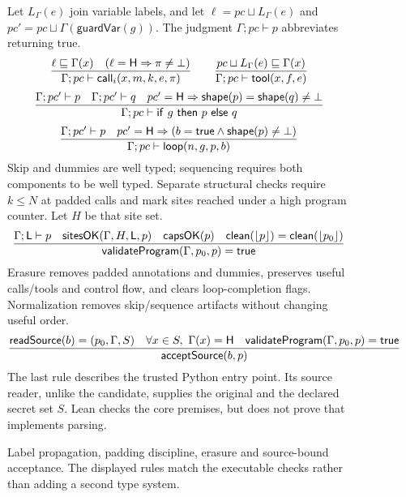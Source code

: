 \begin{figure}[p]
\small
Let $L_\Gamma(e)$ join variable labels, and let
$\ell=pc\sqcup L_\Gamma(e)$ and $pc'=pc\sqcup\Gamma(\mathsf{guardVar}(g))$.
The judgment $\Gamma;pc\vdash p$ abbreviates  returning true.
\[
\frac{\ell\sqsubseteq\Gamma(x)\quad(\ell=\mathsf{H}\Rightarrow\pi\ne\bot)}
 {\Gamma;pc\vdash\mathsf{call}_i(x,m,k,e,\pi)}
\qquad
\frac{pc\sqcup L_\Gamma(e)\sqsubseteq\Gamma(x)}
 {\Gamma;pc\vdash\mathsf{tool}(x,f,e)}
\]
\[
\frac{\Gamma;pc'\vdash p\quad\Gamma;pc'\vdash q\quad
 pc'=\hi\Rightarrow\mathsf{shape}(p)=\mathsf{shape}(q)\ne\bot}
 {\Gamma;pc\vdash\mathsf{if}\ g\ \mathsf{then}\ p\ \mathsf{else}\ q}
\]
\[
\frac{\Gamma;pc'\vdash p\quad
 pc'=\mathsf{H}\Rightarrow(b=\mathsf{true}\land\mathsf{shape}(p)\ne\bot)}
 {\Gamma;pc\vdash\mathsf{loop}(n,g,p,b)}
\]
Skip and dummies are well typed; sequencing requires both components to be well
typed. Separate structural checks require $k\leq N$ at padded calls and mark
sites reached under a high program counter. Let $H$ be that site set.
\[
\frac{\Gamma;\mathsf{L}\vdash p\quad\mathsf{sitesOK}(\Gamma,H,\mathsf{L},p)\quad
 \mathsf{capsOK}(p)\quad
 \mathsf{clean}(\lfloor p\rfloor)=\mathsf{clean}(\lfloor p_0\rfloor)}
 {\mathsf{validateProgram}(\Gamma,p_0,p)=\mathsf{true}}
\]
Erasure removes padded annotations and dummies, preserves useful calls/tools and
control flow, and clears loop-completion flags. Normalization 
removes skip/sequence artifacts without changing useful order.
\[
\frac{\mathsf{readSource}(b)=(p_0,\Gamma,S)\quad
       \forall x\in S,\ \Gamma(x)=\mathsf{H}\quad
       \mathsf{validateProgram}(\Gamma,p_0,p)=\mathsf{true}}
      {\mathsf{acceptSource}(b,p)}
\]
The last rule describes the trusted Python entry point. Its source reader, unlike
the candidate, supplies the original and the declared secret set $S$. Lean checks
the core premises, but does not prove that  implements parsing.
\caption{Label propagation, padding discipline, erasure and source-bound
acceptance. The displayed rules match the executable checks rather than adding
a second type system.}
\label{fig:validation}
\end{figure}

